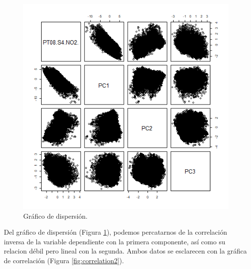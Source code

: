 \documentclass[a4paper,10pt,twocolumn]{article}
\begin{document}
  \begin{figure}[htb]%
  	\begin{center}
  		\includegraphics[width=\linewidth]{Images/pairs1.png}
  	\end{center}
  	\caption{Gráfico de dispersión.}
  	\label{fig:pairs1}
  \end{figure}

  Del gráfico de dispersión (Figura \ref{fig:pairs1}), podemos percatarnos de la correlación inversa de la variable dependiente con la primera componente, así como su relacion débil pero lineal con la segunda. Ambos datos se esclarecen con la gráfica de correlación (Figura \ref{fig:correlation2}).
\end{document}
